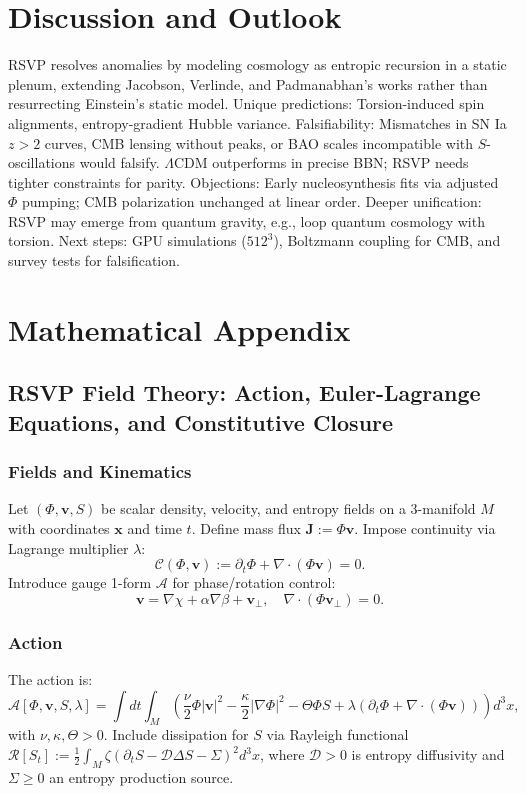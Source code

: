 \documentclass[11pt]{article}
\theoremstyle{plain}
\theoremstyle{definition}
\begin{document}
\section{Discussion and Outlook}
RSVP resolves anomalies by modeling cosmology as entropic recursion in a static plenum, extending Jacobson, Verlinde, and Padmanabhan's works rather than resurrecting Einstein's static model.
Unique predictions: Torsion-induced spin alignments, entropy-gradient Hubble variance.
Falsifiability: Mismatches in SN Ia $z>2$ curves, CMB lensing without peaks, or BAO scales incompatible with $S$-oscillations would falsify. $\Lambda$CDM outperforms in precise BBN; RSVP needs tighter constraints for parity.
Objections: Early nucleosynthesis fits via adjusted $\Phi$ pumping; CMB polarization unchanged at linear order.
Deeper unification: RSVP may emerge from quantum gravity, e.g., loop quantum cosmology with torsion. Next steps: GPU simulations ($512^3$), Boltzmann coupling for CMB, and survey tests for falsification.
\appendix
\section{Mathematical Appendix}
\subsection{RSVP Field Theory: Action, Euler-Lagrange Equations, and Constitutive Closure}
\subsubsection{Fields and Kinematics}
Let $(\Phi, \bm{v}, S)$ be scalar density, velocity, and entropy fields on a 3-manifold $M$ with coordinates $\bm{x}$ and time $t$. Define mass flux $\bm{J} := \Phi \bm{v}$. Impose continuity via Lagrange multiplier $\lambda$:
\[
\mathcal{C}(\Phi, \bm{v}) := \partial_t \Phi + \nabla \cdot (\Phi \bm{v}) = 0.
\]
Introduce gauge 1-form $\mathcal{A}$ for phase/rotation control:
\[
\bm{v} = \nabla \chi + \alpha \nabla \beta + \bm{v}_\perp, \quad \nabla \cdot (\Phi \bm{v}_\perp) = 0.
\]
\subsubsection{Action}
The action is:
\[
\mathcal{A}[\Phi, \bm{v}, S, \lambda] = \int dt \int_M \left( \frac{\nu}{2} \Phi |\bm{v}|^2 - \frac{\kappa}{2} |\nabla \Phi|^2 - \Theta \Phi S + \lambda (\partial_t \Phi + \nabla \cdot (\Phi \bm{v})) \right) d^3x,
\]
with $\nu, \kappa, \Theta > 0$. Include dissipation for $S$ via Rayleigh functional $\mathcal{R}[S_t] := \frac{1}{2} \int_M \zeta (\partial_t S - \mathcal{D} \Delta S - \Sigma)^2 d^3x$, where $\mathcal{D} > 0$ is entropy diffusivity and $\Sigma \geq 0$ an entropy production source.
\end{document}
